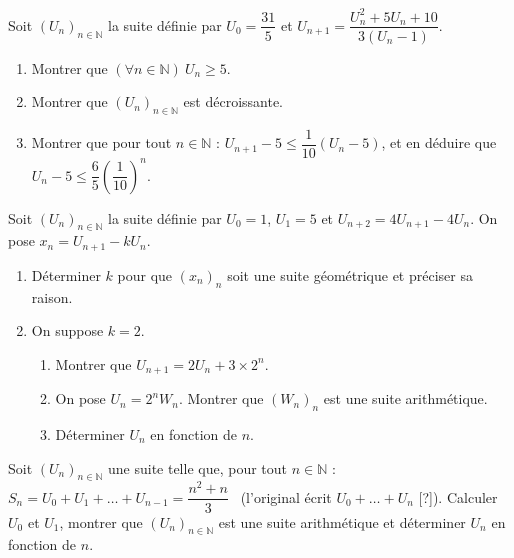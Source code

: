 \fin
{}
Soit $(U_n)_{n\in\mathbb{N}}$ la suite définie par $U_0=\dfrac{31}{5}$ et $U_{n+1}=\dfrac{U_n^2+5U_n+10}{3(U_n-1)}$.
\begin{enumerate}
\item Montrer que $(\forall n\in\mathbb{N})\ U_n\geq5$.
\item Montrer que $(U_n)_{n\in\mathbb{N}}$ est décroissante.
\item Montrer que pour tout $n\in\mathbb{N}$ : $U_{n+1}-5\leq\dfrac{1}{10}(U_n-5)$, et en déduire que $U_n-5\leq\dfrac65\left(\dfrac{1}{10}\right)^n$.
\end{enumerate}
\fin
{}
Soit $(U_n)_{n\in\mathbb{N}}$ la suite définie par $U_0=1$, $U_1=5$ et $U_{n+2}=4U_{n+1}-4U_n$. On pose $x_n=U_{n+1}-kU_n$.
\begin{enumerate}
\item Déterminer $k$ pour que $(x_n)_n$ soit une suite géométrique et préciser sa raison.
\item On suppose $k=2$.
\begin{enumerate}
\item Montrer que $U_{n+1}=2U_n+3\times2^n$.
\item On pose $U_n=2^nW_n$. Montrer que $(W_n)_n$ est une suite arithmétique.
\item Déterminer $U_n$ en fonction de $n$.
\end{enumerate}
\end{enumerate}
\fin
{}
Soit $(U_n)_{n\in\mathbb{N}}$ une suite telle que, pour tout $n\in\mathbb{N}$ : $S_n=U_0+U_1+\dots+U_{n-1}=\dfrac{n^2+n}{3}$ \ (l'original écrit $U_0+\dots+U_n$ [?]).
Calculer $U_0$ et $U_1$, montrer que $(U_n)_{n\in\mathbb{N}}$ est une suite arithmétique et déterminer $U_n$ en fonction de $n$.
\fin
